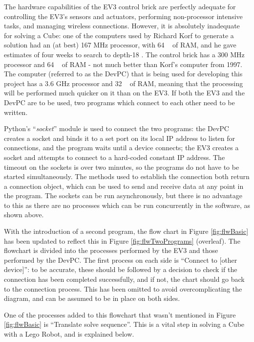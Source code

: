 \documentclass{report}
\newcommand{\tit}[1]{\textit{#1}}
\newcommand{\propernoun}[1]{\enquote{\tit{#1}}}
\begin{document}
    The hardware capabilities of the EV3 control brick are perfectly adequate for controlling the EV3's sensors and actuators, performing non-processor intensive tasks, and managing wireless connections. However, it is absolutely inadequate for solving a Cube: one of the computers used by Richard Korf to generate a solution had an (at best) 167 \si{\mega\hertz} processor, with 64 \si{\mega\byte} of RAM, and he gave estimates of four weeks to search to depth-18 \cite{Korf1997}. The control brick has a 300 \si{\mega\hertz} processor and 64 \si{\mega\byte} of RAM - not much better than Korf's computer from 1997. The computer (referred to as the DevPC) that is being used for developing this project has a 3.6 \si{\giga\hertz} processor and 32 \si{\giga\byte} of RAM, meaning that the processing will be performed much quicker on it than on the EV3. If both the EV3 and the DevPC are to be used, two programs which connect to each other need to be written.
    
    Python's \propernoun{socket} module is used to connect the two programs: the DevPC creates a socket and binds it to a set port on its local IP address to listen for connections, and the program waits until a device connects; the EV3 creates a socket and attempts to connect to a hard-coded constant IP address. The timeout on the sockets is over two minutes, so the programs do not have to be started simultaneously. The methods used to establish the connection both return a connection object, which can be used to send and receive data at any point in the program. The sockets can be run asynchronously, but there is no advantage to this as there are no processes which can be run concurrently in the software, as shown above.
    
    With the introduction of a second program, the flow chart in Figure \ref{fig:flwBasic} has been updated to reflect this in Figure \ref{fig:flwTwoPrograms} (overleaf). The flowchart is divided into the processes performed by the EV3 and those performed by the DevPC. The first process on each side is \enquote{Connect to [other device]}: to be accurate, these should be followed by a decision to check if the connection has been completed successfully, and if not, the chart should go back to the connection process. This has been omitted to avoid overcomplicating the diagram, and can be assumed to be in place on both sides.
    
    One of the processes added to this flowchart that wasn't mentioned in Figure \ref{fig:flwBasic} is \enquote{Translate solve sequence}. This is a vital step in solving a Cube with a Lego Robot, and is explained below.
    
\end{document}
